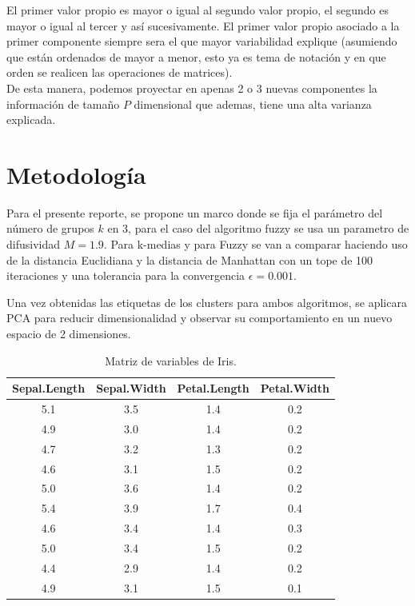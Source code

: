 \documentclass[11pt, letterpaper]{article}
\begin{document}
El primer valor propio es mayor o igual al segundo valor propio, el segundo es mayor o igual al tercer y así sucesivamente. El primer valor propio asociado a la primer componente siempre sera el que mayor variabilidad explique (asumiendo que están ordenados de mayor a menor, esto ya es tema de notación y en que orden se realicen las operaciones de matrices). \\

De esta manera, podemos proyectar en apenas 2 o 3 nuevas componentes la información de tamaño $P$ dimensional que ademas, tiene una alta varianza explicada.




\newpage

\section{Metodología}

Para el presente reporte, se propone un marco donde se fija el parámetro del número de grupos $k$ en 3, para el caso del algoritmo fuzzy se usa un parametro de difusividad $M = 1.9$. Para k-medias y para Fuzzy se van a comparar haciendo uso de la distancia Euclidiana y la distancia de Manhattan con un tope de 100 iteraciones y una tolerancia para la convergencia $\epsilon = 0.001$.

Una vez obtenidas las etiquetas de los clusters para ambos algoritmos, se aplicara PCA para reducir dimensionalidad y observar su comportamiento en un nuevo espacio de 2 dimensiones.






\begin{table}[ht]
	\centering
	\begin{tabular}{cccc}
		\hline
\textbf{Sepal.Length} & \textbf{Sepal.Width} & \textbf{Petal.Length} & \textbf{Petal.Width} \\
		\hline

5.1          & 3.5         & 1.4          & 0.2 \\
4.9          & 3.0         & 1.4          & 0.2  \\        
4.7          & 3.2         & 1.3          & 0.2  \\       
4.6          & 3.1         & 1.5          & 0.2  \\       
5.0          & 3.6         & 1.4          & 0.2    \\     
5.4          & 3.9         & 1.7          & 0.4      \\     
4.6          & 3.4         & 1.4          & 0.3        \\   
5.0          & 3.4         & 1.5          & 0.2          \\ 
4.4          & 2.9         & 1.4          & 0.2           \\
4.9          & 3.1         & 1.5          & 0.1          \\
	\end{tabular}
	\caption{Matriz de variables de Iris.}
	\label{tab:rapidez_resistencia}
\end{table}
\end{document}
